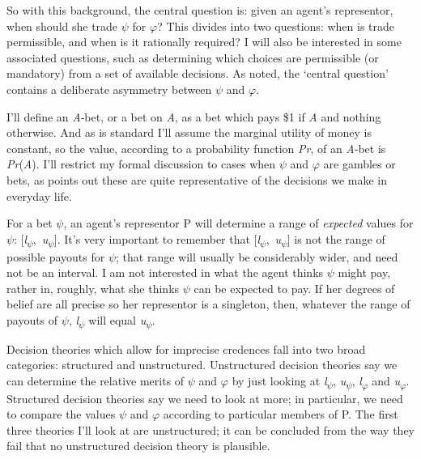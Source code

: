 So with this background, the central question is: given an agent's
representor, when should she trade $\psi$ for $\varphi$? This divides into two
questions: when is trade permissible, and when is it rationally
required? I will also be interested in some associated questions, such
as determining which choices are permissible (or mandatory) from a set
of available decisions. As noted, the `central question' contains a
deliberate asymmetry between $\psi$ and $\varphi$.

I'll define an \emph{A}‑bet, or a bet on \emph{A}, as a bet which pays
\$1 if \emph{A} and nothing otherwise. And as is standard I'll assume
the marginal utility of money is constant, so the value, according to a
probability function \emph{Pr}, of an \emph{A}‑bet is
\emph{Pr}(\emph{A}). I'll restrict my formal discussion to cases when $\psi$
and $\varphi$ are gambles or bets, as \citet{RamseyTruthProb} points out these are quite
representative of the decisions we make in everyday life.

For a bet $\psi$, an agent's representor P will determine a range of
\emph{expected} values for $\psi$:
{[}\emph{l}\textsubscript{$\psi$},~\emph{u}\textsubscript{$\psi$}{]}. It's very
important to remember that
{[}\emph{l}\textsubscript{$\psi$},~\emph{u}\textsubscript{$\psi$}{]} is not the
range of possible payouts for $\psi$; that range will usually be considerably
wider, and need not be an interval. I am not interested in what the
agent thinks $\psi$ might pay, rather in, roughly, what she thinks $\psi$ can be
expected to pay. If her degrees of belief are all precise so her
representor is a singleton, then, whatever the range of payouts of $\psi$,
\emph{l}\textsubscript{$\psi$} will equal \emph{u}\textsubscript{$\psi$}.

Decision theories which allow for imprecise credences fall into two
broad categories: structured and unstructured. Unstructured decision
theories say we can determine the relative merits of $\psi$ and $\varphi$ by just
looking at \emph{l}\textsubscript{$\psi$}, \emph{u}\textsubscript{$\psi$},
\emph{l}\textsubscript{$\varphi$} and \emph{u}\textsubscript{$\varphi$}. Structured
decision theories say we need to look at more; in particular, we need to
compare the values $\psi$ and $\varphi$ according to particular members of P. The
first three theories I'll look at are unstructured; it can be concluded
from the way they fail that no unstructured decision theory is
plausible.

